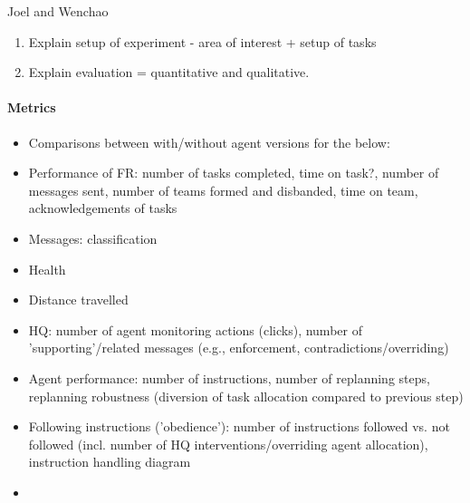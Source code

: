 Joel and Wenchao
\begin{enumerate}
\item Explain setup of experiment - area of interest + setup of tasks
\item Explain evaluation = quantitative and qualitative.
\end{enumerate}
\paragraph{Metrics}
\begin{itemize}
\item{Comparisons between with/without agent versions for the below:}
\item{Performance of FR: number of tasks completed, time on task?, number of messages sent, number of teams formed and disbanded, time on team, acknowledgements of tasks}
\item{Messages: classification}
\item{Health}
\item{Distance travelled}
\item{HQ: number of agent monitoring actions (clicks), number of 'supporting'/related messages (e.g., enforcement, contradictions/overriding)}
\item{Agent performance: number of instructions, number of replanning steps, replanning robustness (diversion of task allocation compared to previous step)}
\item{Following instructions ('obedience'): number of instructions followed vs. not followed (incl. number of HQ interventions/overriding agent allocation), instruction handling diagram}
\item
\end{itemize}
